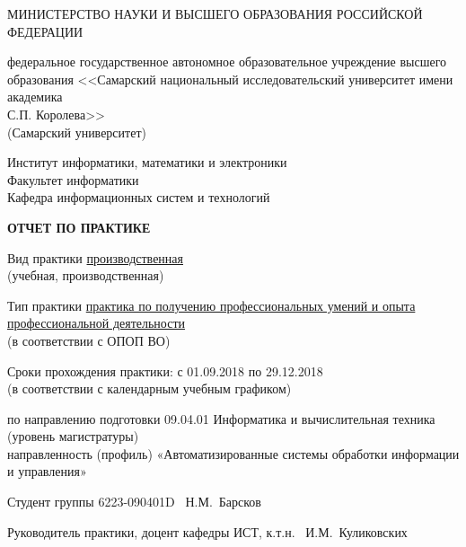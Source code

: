 \documentclass[a4paper, 12pt]{extreport}
\begin{document}
    \begin{center}
        МИНИСТЕРСТВО НАУКИ И ВЫСШЕГО ОБРАЗОВАНИЯ РОССИЙСКОЙ ФЕДЕРАЦИИ
        \vspace{12pt}

        федеральное государственное автономное образовательное учреждение высшего \\ образования
        <<Самарский национальный исследовательский университет имени академика \\ С.П. Королева>> \\
        (Самарский университет)
        \vspace{12pt}

        Институт информатики, математики и электроники \\
        Факультет информатики \\
        Кафедра информационных систем и технологий
        \vspace{60pt}

        \textbf{ОТЧЕТ ПО ПРАКТИКЕ}
        \vspace{36pt}

        Вид практики \underline{производственная} \\
        (учебная, производственная)
        \vspace{12pt}

        Тип практики \underline{практика по получению профессиональных умений и опыта} \\
        \underline{профессиональной деятельности} \\
        (в соответствии с ОПОП ВО)
        \vspace{12pt}

        Сроки прохождения практики: с 01.09.2018 по 29.12.2018 \\
        (в соответствии с календарным учебным графиком)
        \vspace{12pt}

        по направлению подготовки 09.04.01 Информатика и вычислительная техника \\
        (уровень магистратуры) \\
        направленность (профиль) «Автоматизированные системы обработки информации \\ и управления»
    \end{center}

    \noindent Студент группы  6223-090401D \hrulefill \mbox{ Н.М. Барсков}

    \noindent Руководитель практики, \hfill \break
    доцент кафедры ИСТ, к.т.н. \hrulefill \mbox{ И.М. Куликовских}\vspace{36pt}
\end{document}

